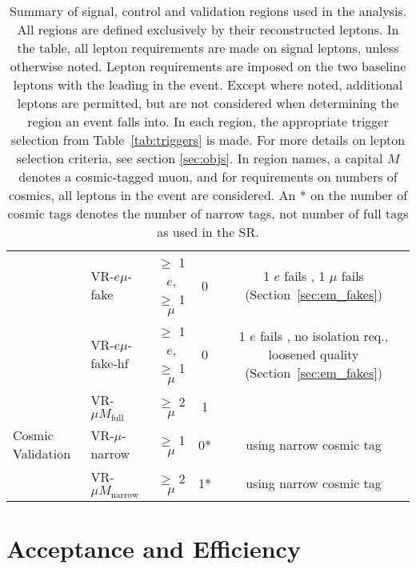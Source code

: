 \begin{sidewaystable}[htb]
\begin{center}
\begin{tabular}{|l|l|c|c|c|}
									&VR-$e\mu$-fake			& $\geq$ 1 $e$, $\geq$ 1 $\mu$ 	& 0 & 1 $e$ fails \dpt, 1 $\mu$ fails \chiCB (Section~\ref{sec:em_fakes}) \\ 
									&VR-$e\mu$-fake-hf		& $\geq$ 1 $e$, $\geq$ 1 $\mu$	& 0 & 1 $e$ fails \dpt, no isolation req., loosened quality (Section~\ref{sec:em_fakes}) \\
\hline
\multirow{3}{*}{Cosmic Validation}	&VR-$\mu M_{\mathrm{full}}$  & $\geq$ 2 $\mu$			& 1 	& \\		
									&VR-$\mu$-narrow 			& $\geq$ 1 $\mu$			& 0* 	& using narrow cosmic tag \\
									&VR-$\mu M_{\mathrm{narrow}}$& $\geq$ 2 $\mu$			& 1* 	& using narrow cosmic tag \\

\hline

\hline
\end{tabular}
\caption{Summary of signal, control and validation regions used in the analysis. All regions are defined exclusively by their reconstructed leptons. In the table, all lepton requirements are made on signal leptons, unless otherwise noted. Lepton requirements are imposed on the two baseline leptons with the leading \pt in the event. Except where noted, additional leptons are permitted, but are not considered when determining the region an event falls into. In each region, the appropriate trigger selection from Table~\ref{tab:triggers} is made. For more details on lepton selection criteria, see section \ref{sec:objs}. In region names, a capital $M$ denotes a cosmic-tagged muon, and for requirements on numbers of cosmics, all leptons in the event are considered. An * on the number of cosmic tags denotes the number of narrow tags, not number of full tags as used in the SR.}
\label{tab:regions}
\end{center}
\end{sidewaystable}

\section{Acceptance and Efficiency}

